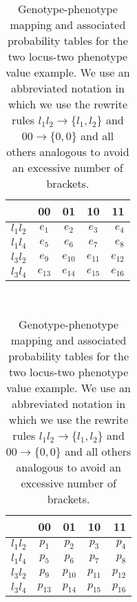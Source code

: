 \begin{table}[!ht]
\centering
\begin{subtable}[t]{0.4\textwidth}
\centering
\begin{tabular}{ l || c | c | c | r }
	          &	00 & 01 & 10 & 11\\ \hline
    $l_1 l_2$ & $e_1$ & $e_2$ & $e_3$ & $e_4$\\ \hline
    $l_1 l_4$ & $e_5$ & $e_6$ & $e_7$ & $e_8$\\ \hline
    $l_3 l_2$ & $e_9$ & $e_{10}$ & $e_{11}$ & $e_{12}$\\ \hline
    $l_3 l_4$ & $e_{13}$ & $e_{14}$ & $e_{15}$ & $e_{16}$\\
    \hline
    \end{tabular}
    \caption{genotype-phenotype maps}
    \label{tab:gpm}
\end{subtable}
~~~~~~
\begin{subtable}[t]{0.4\textwidth}
\centering
	\begin{tabular}{ l || c | c | c | r }
	          &	00 & 01 & 10 & 11\\ \hline
    $l_1 l_2$ & $p_1$ & $p_2$ & $p_3$ & $p_4$\\ \hline
    $l_1 l_4$ & $p_5$ & $p_6$ & $p_7$ & $p_8$\\ \hline
    $l_3 l_2$ & $p_9$ & $p_{10}$ & $p_{11}$ & $p_{12}$\\ \hline
    $l_3 l_4$ & $p_{13}$ & $p_{14}$ & $p_{15}$ & $p_{16}$\\
    \hline
	\end{tabular}
	\caption{probabilities}
    \label{tab:probabilities}
\end{subtable}
\caption{Genotype-phenotype mapping and associated probability tables for the two locus-two phenotype value example. We use an abbreviated notation in which we use the rewrite rules $l_1 l_2 \rightarrow \{l_1, l_2\}$ and $00 \rightarrow \{0, 0\}$ and all others analogous to avoid an excessive number of brackets.}
\label{tab:example}
\end{table}
